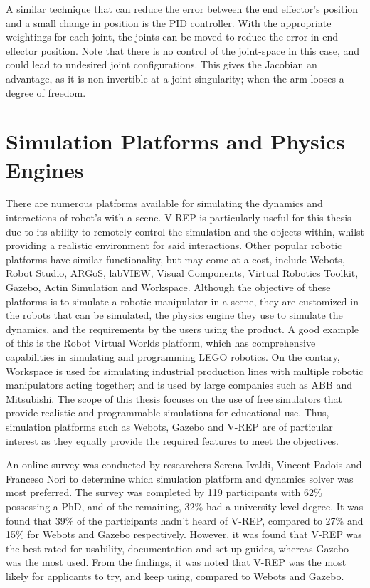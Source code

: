 \documentclass[12pt,openany,a4paper]{book}
\begin{document}
A similar technique that can reduce the error between the end effector's position and a small change in position is the PID controller. With the appropriate weightings for each joint, the joints can be moved to reduce the error in end effector position. Note that there is no control of the joint-space in this case, and could lead to undesired joint configurations. This gives the Jacobian an advantage, as it is non-invertible at a joint singularity; when the arm looses a degree of freedom.


\section{Simulation Platforms and Physics Engines}
There are numerous platforms available for simulating the dynamics and interactions of robot's with a scene. V-REP is particularly useful for this thesis due to its ability to remotely control the simulation and the objects within, whilst providing a realistic environment for said interactions. Other popular robotic platforms have similar functionality, but may come at a cost, include Webots, Robot Studio, ARGoS, labVIEW, Visual Components, Virtual Robotics Toolkit, Gazebo, Actin Simulation and Workspace. Although the objective of these platforms is to simulate a robotic manipulator in a scene, they are customized in the robots that can be simulated, the physics engine they use to simulate the dynamics, and the requirements by the users using the product. A good example of this is the Robot Virtual Worlds platform, which has comprehensive capabilities in simulating and programming LEGO robotics. On the contary, Workspace is used for simulating industrial production lines with multiple robotic manipulators acting together; and is used by large companies such as ABB and Mitsubishi. The scope of this thesis focuses on the use of free simulators that provide realistic and programmable simulations for educational use. Thus, simulation platforms such as Webots, Gazebo and V-REP are of particular interest as they equally provide the required features to meet the objectives. 

An online survey was conducted by researchers Serena Ivaldi, Vincent Padois and Franceso Nori to determine which simulation platform and dynamics solver was most preferred. The survey was completed by 119 participants with 62\% possessing a PhD, and of the remaining, 32\% had a university level degree. It was found that 39\% of the participants hadn't heard of V-REP, compared to 27\% and 15\% for Webots and Gazebo respectively. However, it was found that V-REP was the best rated for usability, documentation and set-up guides, whereas Gazebo was the most used. From the findings, it was noted that V-REP was the most likely for applicants to try, and keep using, compared to Webots and Gazebo.
\end{document}
